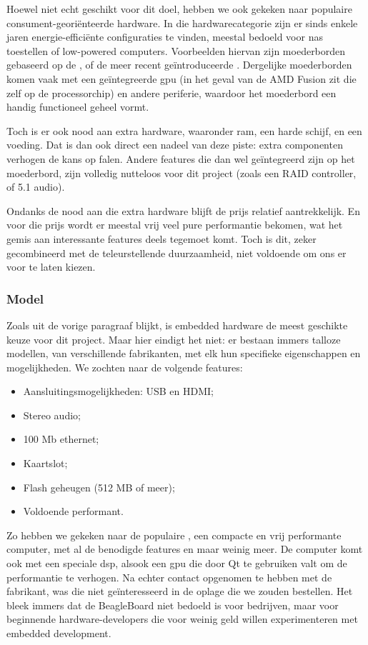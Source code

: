 Hoewel niet echt geschikt voor dit doel, hebben we ook gekeken naar populaire consument-georiënteerde hardware. In die hardwarecategorie zijn er sinds enkele jaren energie-efficiënte configuraties te vinden, meestal bedoeld voor \ac{nas} toestellen of low-powered computers. Voorbeelden hiervan zijn moederborden gebaseerd op de , of de meer recent geïntroduceerde . Dergelijke moederborden komen vaak met een geïntegreerde \ac{gpu} (in het geval van de AMD Fusion zit die zelf op de processorchip) en andere periferie, waardoor het moederbord een handig functioneel geheel vormt.

Toch is er ook nood aan extra hardware, waaronder \ac{ram}, een harde schijf, en een voeding. Dat is dan ook direct een nadeel van deze piste: extra componenten verhogen de kans op falen. Andere features die dan wel geïntegreerd zijn op het moederbord, zijn volledig nutteloos voor dit project (zoals een RAID controller, of 5.1 audio).

Ondanks de nood aan die extra hardware blijft de prijs relatief aantrekkelijk. En voor die prijs wordt er meestal vrij veel pure performantie bekomen, wat het gemis aan interessante features deels tegemoet komt. Toch is dit, zeker gecombineerd met de teleurstellende duurzaamheid, niet voldoende om ons er voor te laten kiezen.

\subsubsection{Model}

Zoals uit de vorige paragraaf blijkt, is embedded hardware de meest geschikte keuze voor dit project. Maar hier eindigt het niet: er bestaan immers talloze modellen, van verschillende fabrikanten, met elk hun specifieke eigenschappen en mogelijkheden. We zochten naar de volgende features:
\begin{itemize}
\item Aansluitingsmogelijkheden: USB en HDMI;
\item Stereo audio;
\item 100 Mb ethernet;
\item Kaartslot;
\item Flash geheugen (512 MB of meer);
\item Voldoende performant.
\end{itemize}

Zo hebben we gekeken naar de populaire , een compacte en vrij performante computer, met al de benodigde features en maar weinig meer. De computer komt ook met een speciale \ac{dsp}, alsook een \ac{gpu} die door Qt te gebruiken valt om de performantie te verhogen. Na echter contact opgenomen te hebben met de fabrikant, was die niet geïnteresseerd in de oplage die we zouden bestellen. Het bleek immers dat de BeagleBoard niet bedoeld is voor bedrijven, maar voor beginnende hardware-developers die voor weinig geld willen experimenteren met embedded development.

